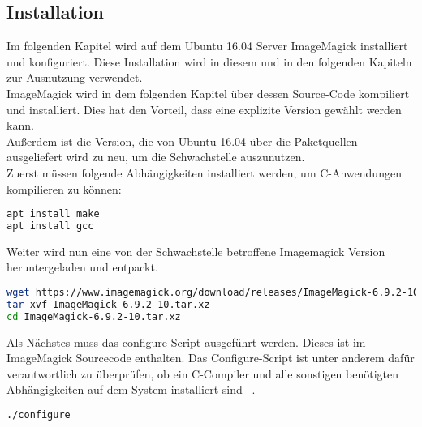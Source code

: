 \subsection{Installation}\label{subsec:installation}

Im folgenden Kapitel wird auf dem Ubuntu 16.04 Server ImageMagick installiert und konfiguriert.
Diese Installation wird in diesem und in den folgenden Kapiteln zur Ausnutzung verwendet.\\

ImageMagick wird in dem folgenden Kapitel über dessen Source-Code kompiliert und installiert.
Dies hat den Vorteil, dass eine explizite Version gewählt werden kann.\\

Außerdem ist die Version, die von Ubuntu 16.04 über die Paketquellen ausgeliefert wird zu neu,
um die Schwachstelle auszunutzen. \\

Zuerst müssen folgende Abhängigkeiten installiert werden, um C-Anwendungen kompilieren zu können:

\begin{lstlisting}[language=Bash, caption=Imagemagick Installation: Dependencies,label={lst:installdep}]
apt install make
apt install gcc
\end{lstlisting}
\vspace{5mm}

Weiter wird nun eine von der Schwachstelle betroffene Imagemagick Version heruntergeladen und entpackt.
\begin{lstlisting}[language=Bash, caption=Imagemgaick Installation: Source Code herunterladen und entpacken,label={lst:installsource}]
wget https://www.imagemagick.org/download/releases/ImageMagick-6.9.2-10.tar.xz
tar xvf ImageMagick-6.9.2-10.tar.xz
cd ImageMagick-6.9.2-10.tar.xz
\end{lstlisting}
\vspace{5mm}

Als Nächstes muss das configure-Script ausgeführt werden.
Dieses ist im ImageMagick Sourcecode enthalten.
Das Configure-Script ist unter anderem dafür verantwortlich zu überprüfen,
ob ein C-Compiler und alle sonstigen benötigten Abhängigkeiten auf dem System installiert sind
~\cite{georgebrocklehurstMagicConfigureMake}.\\

\begin{lstlisting}[language=Bash, caption=Imagemagick Installation: Configure,label={lst:installconfigure}]
./configure

\end{lstlisting}
\vspace{5mm}

